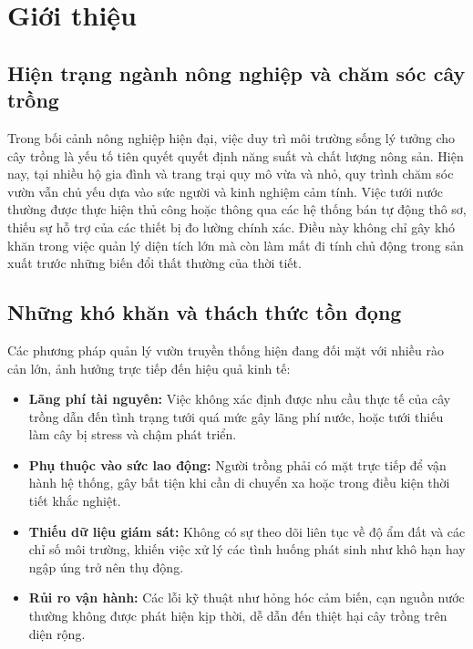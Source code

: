 \section{Giới thiệu}

\subsection{Hiện trạng ngành nông nghiệp và chăm sóc cây trồng}
Trong bối cảnh nông nghiệp hiện đại, việc duy trì môi trường sống lý tưởng cho cây trồng là yếu tố tiên quyết quyết định năng suất và chất lượng nông sản. Hiện nay, tại nhiều hộ gia đình và trang trại quy mô vừa và nhỏ, quy trình chăm sóc vườn vẫn chủ yếu dựa vào sức người và kinh nghiệm cảm tính. Việc tưới nước thường được thực hiện thủ công hoặc thông qua các hệ thống bán tự động thô sơ, thiếu sự hỗ trợ của các thiết bị đo lường chính xác. Điều này không chỉ gây khó khăn trong việc quản lý diện tích lớn mà còn làm mất đi tính chủ động trong sản xuất trước những biến đổi thất thường của thời tiết.

\subsection{Những khó khăn và thách thức tồn đọng}
Các phương pháp quản lý vườn truyền thống hiện đang đối mặt với nhiều rào cản lớn, ảnh hưởng trực tiếp đến hiệu quả kinh tế:
\begin{itemize}
    \item \textbf{Lãng phí tài nguyên:} Việc không xác định được nhu cầu thực tế của cây trồng dẫn đến tình trạng tưới quá mức gây lãng phí nước, hoặc tưới thiếu làm cây bị stress và chậm phát triển.
    \item \textbf{Phụ thuộc vào sức lao động:} Người trồng phải có mặt trực tiếp để vận hành hệ thống, gây bất tiện khi cần di chuyển xa hoặc trong điều kiện thời tiết khắc nghiệt.
    \item \textbf{Thiếu dữ liệu giám sát:} Không có sự theo dõi liên tục về độ ẩm đất và các chỉ số môi trường, khiến việc xử lý các tình huống phát sinh như khô hạn hay ngập úng trở nên thụ động.
    \item \textbf{Rủi ro vận hành:} Các lỗi kỹ thuật như hỏng hóc cảm biến, cạn nguồn nước thường không được phát hiện kịp thời, dễ dẫn đến thiệt hại cây trồng trên diện rộng.
\end{itemize}

